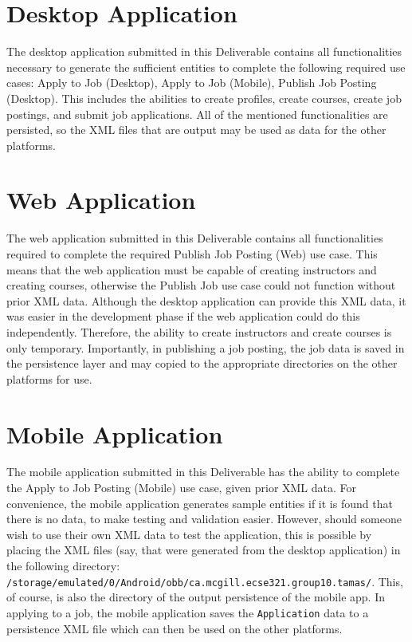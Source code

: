 \documentclass[12pt]{report}
\begin{document}
\section{Desktop Application}
The desktop application submitted in this Deliverable contains all functionalities necessary to
generate the sufficient entities to complete the following required use cases: Apply to Job
(Desktop), Apply to Job (Mobile), Publish Job Posting (Desktop). This includes the abilities to
create profiles, create courses, create job postings, and submit job applications. All of the
mentioned functionalities are persisted, so the XML files that are output may be used as data for
the other platforms.

\section{Web Application}
The web application submitted in this Deliverable contains all functionalities required to complete
the required Publish Job Posting (Web) use case. This means that the web application must be capable
of creating instructors and creating courses, otherwise the Publish Job use case could not function
without prior XML data. Although the desktop application can provide this XML data, it was easier in
the development phase if the web application could do this independently. Therefore, the ability to
create instructors and create courses is only temporary. Importantly, in publishing a job posting,
the job data is saved in the persistence layer and may copied to the appropriate directories on the
other platforms for use.

\section{Mobile Application}
The mobile application submitted in this Deliverable has the ability to complete the Apply to Job
Posting (Mobile) use case, given prior XML data. For convenience, the mobile application generates
sample entities if it is found that there is no data, to make testing and validation easier.
However, should someone wish to use their own XML data to test the application, this is possible by
placing the XML files (say, that were generated from the desktop application) in the following
directory: \texttt{/storage/emulated/0/Android/obb/ca.mcgill.ecse321.group10.tamas/}. This, of
course, is also the directory of the output persistence of the mobile app. In applying to a job, the
mobile application saves the \texttt{Application} data to a persistence XML file which can then be
used on the other platforms.
\end{document}
